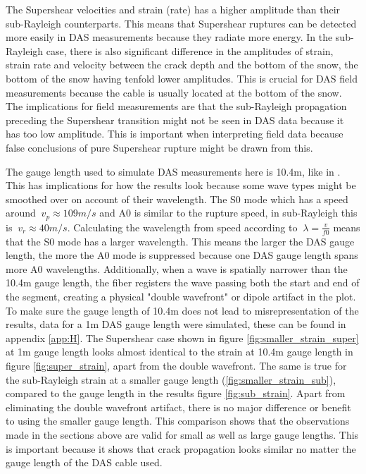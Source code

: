The Supershear velocities and strain (rate) has a higher amplitude than their sub-Rayleigh counterparts. This means that Supershear ruptures can be detected more easily in DAS measurements because they radiate more energy. In the sub-Rayleigh case, there is also significant difference in the amplitudes of strain, strain rate and velocity between the crack depth and the bottom of the snow, the bottom of the snow having tenfold lower amplitudes. This is crucial for DAS field measurements because the cable is usually located at the bottom of the snow. The implications for field measurements are that the sub-Rayleigh propagation preceding the Supershear transition \parencite{trottetTransitionSubRayleighAnticrack2022} might not be seen in DAS data because it has too low amplitude. This is important when interpreting field data because false conclusions of pure Supershear rupture might be drawn from this. \par 

The gauge length used to simulate DAS measurements here is 10.4m, like in \cite{turquetAutomatedSnowAvalanche2024}. This has implications for how the results look because some wave types might be smoothed over on account of their wavelength. The S0 mode which has a speed around $\ v_p \approx 109 m/s$ and A0 is similar to the rupture speed, in sub-Rayleigh this is $\ v_r \approx 40 m/s$. Calculating the wavelength from speed according to $\ \lambda = \frac{v}{f0}$ \parencite{kAkiRichards19801981} means that the S0 mode has a larger wavelength. This means the larger the DAS gauge length, the more the A0 mode is suppressed because one DAS gauge length spans more A0 wavelengths. Additionally, when a wave is spatially narrower than the 10.4m gauge length, the fiber registers the wave passing both the start and end of the segment, creating a physical "double wavefront" or dipole artifact in the plot. To make sure the gauge length of 10.4m does not lead to misrepresentation of the results, data for a 1m DAS gauge length were simulated, these can be found in appendix \ref{app:H}. The Supershear case shown in figure \ref{fig:smaller_strain_super} at 1m gauge length looks almost identical to the strain at 10.4m gauge length in figure \ref{fig:super_strain}, apart from the double wavefront. The same is true for the sub-Rayleigh strain at a smaller gauge length (\ref{fig:smaller_strain_sub}), compared to the \cite{turquetAutomatedSnowAvalanche2024} gauge length in the results figure \ref{fig:sub_strain}. Apart from eliminating the double wavefront artifact, there is no major difference or benefit to using the smaller gauge length. This comparison shows that the observations made in the sections above are valid for small as well as large gauge lengths. This is important because it shows that crack propagation looks similar no matter the gauge length of the DAS cable used. \par



